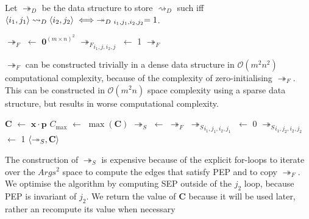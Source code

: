 \begin{definition}
	\label{tensorfixeddecisionframework}
	
	Let $\twoheadrightarrow_D$ be the data structure to store $\rightsquigarrow_D$ such iff $\pair{i_1}{j_1}\rightsquigarrow_D\pair{i_2}{j_2}\iff\twoheadrightarrow_{D\ i_1,j_1,i_2,j_2}=1$.
\end{definition}

\begin{algorithm}[H]
	\caption{}
	\begin{algorithmic}[1]
			\State $\twoheadrightarrow_F$ $\gets$ $\mathbf{0}^{(m\times n)^2}$
					\State ${\twoheadrightarrow_F}_{i_1,j,i_2,j}$ $\gets$ 1
				\EndIf
			\EndFor
			\State \Return $\twoheadrightarrow_F$
		\EndFunction
	\end{algorithmic}
\end{algorithm}

$\twoheadrightarrow_F$ can be constructed trivially in a dense data structure in $\mathcal{O}(m^2n^2)$ computational complexity, because of the complexity of zero-initialising $\twoheadrightarrow_F$. This can be constructed in $\mathcal{O}(m^2n)$ space complexity using a sparse data structure, but results in worse computational complexity.

\begin{algorithm}[H]
	\caption{}
	\begin{algorithmic}[1]
			\State $\mathbf{C}$ $\gets$ $\mathbf{x}\cdot\mathbf{p}$
			\State $C_{\max}$ $\gets$ $\max(\mathbf{C})$
			\State $\twoheadrightarrow_S$ $\gets$ $\twoheadrightarrow_F$
									\State ${\twoheadrightarrow_S}_{i_1,j_1,i_2,j_1}$ $\gets$ 0
								\EndIf
										\State ${\twoheadrightarrow_S}_{i_1,j_2,i_2,j_2}$ $\gets$ 1
									\EndIf
								\EndFor
							\EndFor
						\EndIf
					\EndFor
				\EndIf
			\EndFor
			\State \Return $\langle{\twoheadrightarrow_S},{\mathbf{C}}\rangle$
		\EndFunction
	\end{algorithmic}
\end{algorithm}

The construction of $\twoheadrightarrow_S$ is expensive because of the explicit for-loops to iterate over the $Args^2$ space to compute the edges that satisfy PEP and to copy $\twoheadrightarrow_F$. We optimise the algorithm by computing SEP outside of the $j_2$ loop, because PEP is invariant of $j_2$. We return the value of $\mathbf{C}$ because it will be used later, rather an recompute its value when necessary

